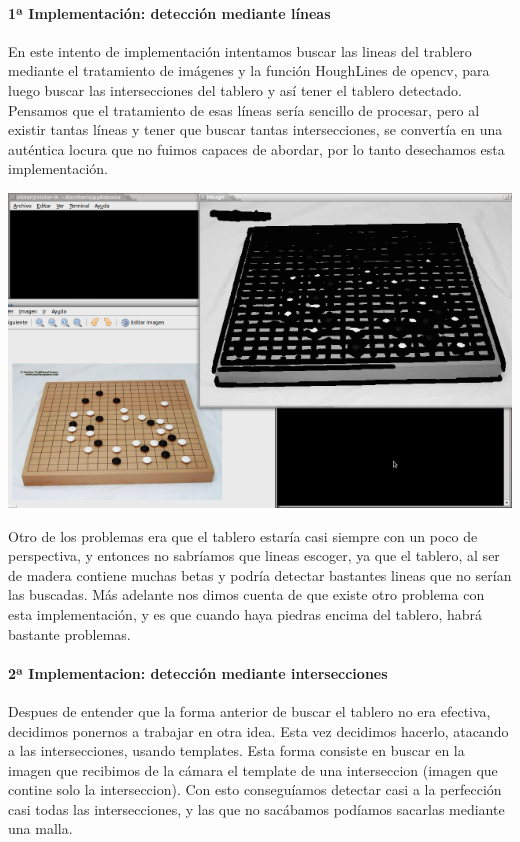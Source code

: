\documentclass[12pt,a4paper]{report}
\begin{document}
\paragraph{1ª Implementación: detección mediante líneas}
En este intento de implementación intentamos buscar las lineas del trablero 
mediante el tratamiento de imágenes y la función HoughLines de opencv, para 
luego buscar las intersecciones del tablero y así tener el tablero detectado. 
Pensamos que el tratamiento de esas líneas sería sencillo de procesar, pero al
existir tantas líneas y tener que buscar tantas intersecciones, se convertía en
una auténtica locura que no fuimos capaces de abordar, por lo tanto desechamos
esta implementación. 

\includegraphics[scale=0.6]{detect-lineas.png}


Otro de los problemas era que el tablero estaría casi siempre con un poco de
perspectiva, y entonces no sabríamos que lineas escoger, ya que el tablero, al
ser de madera contiene muchas betas y podría detectar bastantes lineas que no
serían las buscadas. 
Más adelante nos dimos cuenta de que existe otro problema con esta
implementación, y es que cuando haya piedras encima del tablero, habrá bastante
problemas. 
 

\paragraph{2ª Implementacion: detección mediante intersecciones}

Despues de entender que la forma anterior de buscar el tablero no era efectiva,
decidimos ponernos a trabajar en otra idea. Esta vez decidimos hacerlo, atacando
a las intersecciones, usando templates. Esta forma consiste en buscar en la
imagen que recibimos de la cámara el template de una interseccion (imagen
que contine solo la interseccion). Con esto conseguíamos detectar casi a la
perfección casi todas las intersecciones, y las que no sacábamos podíamos
sacarlas mediante una malla. 
\end{document}
